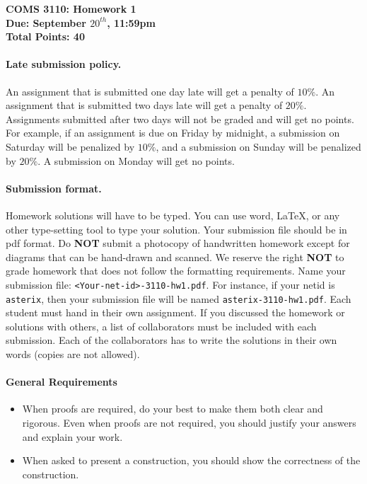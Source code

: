 \documentclass[12pt]{article}
\date{}
\begin{document}
\begin{center}
  \textbf{COMS 3110: Homework 1}\\
  \textbf{Due: September $20^{th}$, 11:59pm}\\
  \textbf{Total Points: 40}
\end{center}


\paragraph{Late submission policy.\ }
An assignment that is submitted one day late will get a penalty of $10\%$. An assignment that is submitted two days late will get a penalty of $20\%$. Assignments submitted after two days will not be graded and will get no points. For example, if an assignment is due on Friday by midnight, a submission on Saturday will be penalized by $10\%$, and a submission on Sunday will be penalized by $20\%$. A submission on Monday will get no points. 

\paragraph{Submission format.\ }
Homework solutions will have to be typed. You can use word, LaTeX, or any other type-setting tool to type your solution. Your submission file should be in pdf format. Do \textbf{NOT} submit a photocopy of handwritten homework except for diagrams that can be hand-drawn and scanned. We reserve the right \textbf{NOT} to grade homework that does not follow the formatting requirements.
Name your submission
file: \texttt{<Your-net-id>-3110-hw1.pdf}. For instance, if your netid
is \texttt{asterix}, then your submission file will be named
\texttt{asterix-3110-hw1.pdf}.
Each student must hand in their own assignment. If you discussed the homework or solutions with others, a list of collaborators must be included with each submission. Each of the collaborators has to write the solutions in their own words (copies are not allowed).

\paragraph{General Requirements}
\begin{itemize}
    \item When proofs are required, do your best to make them both clear and rigorous. Even when proofs are not required, you should justify your answers and explain your work.
    \item When asked to present a construction, you should show the correctness of the construction.
\end{itemize}
\end{document}
